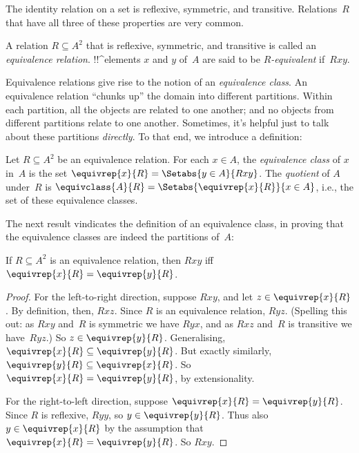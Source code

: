 \documentclass[../../../include/open-logic-section]{subfiles}
\begin{document}

The identity relation on a set is reflexive, symmetric, and
transitive. Relations~$R$ that have all three of these properties are very
common.

\begin{defn} 
A relation $R \subseteq A^2$ that is reflexive, symmetric, and
transitive is called an \emph{equivalence relation}. !!^{element}s $x$
and $y$ of~$A$ are said to be \emph{$R$-equivalent} if~$Rxy$.
\end{defn}

Equivalence relations give rise to the notion of an \emph{equivalence
class}. An equivalence relation ``chunks up'' the domain into
different partitions. Within each partition, all the objects are
related to one another; and no objects from different partitions
relate to one another. Sometimes, it's helpful just to talk about
these partitions \emph{directly}. To that end, we introduce a
definition:

\begin{defn}
Let $R \subseteq A^2$ be an equivalence relation. For each $x \in A$,
the \emph{equivalence class} of $x$ in~$A$ is the set $\equivrep{x}{R}
= \Setabs{y \in A}{Rxy}$. The \emph{quotient} of $A$ under~$R$ is
$\equivclass{A}{R} = \Setabs{\equivrep{x}{R}}{x \in A}$, i.e., the set
of these equivalence classes. 
\end{defn}

The next result vindicates the definition of an equivalence class, in
proving that the equivalence classes are indeed the partitions of~$A$:

\begin{prop}
If $R \subseteq A^2$ is an equivalence relation, then $Rxy$ iff
$\equivrep{x}{R} = \equivrep{y}{R}$.
\end{prop}

\begin{proof}
For the left-to-right direction, suppose $Rxy$, and let $z \in
\equivrep{x}{R}$. By definition, then, $Rxz$. Since $R$ is an
equivalence relation, $Ryz$. (Spelling this out: as $Rxy$ and~$R$ is
symmetric we have $Ryx$, and as $Rxz$ and~$R$ is transitive we
have~$Ryz$.) So $z \in \equivrep{y}{R}$. Generalising,
$\equivrep{x}{R} \subseteq \equivrep{y}{R}$. But exactly similarly,
$\equivrep{y}{R} \subseteq \equivrep{x}{R}$. So $\equivrep{x}{R} =
\equivrep{y}{R}$, by extensionality.

For the right-to-left direction, suppose $\equivrep{x}{R} =
\equivrep{y}{R}$. Since $R$ is reflexive, $Ryy$, so $y \in
\equivrep{y}{R}$. Thus also $y \in \equivrep{x}{R}$ by the assumption
that $\equivrep{x}{R} = \equivrep{y}{R}$. So $Rxy$.
\end{proof}
\end{document}
